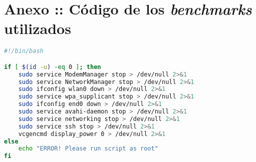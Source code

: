 \chapter{Anexo :: Código de los \textit{benchmarks} utilizados}
\label{cap:AnexoCodigo}

\begin{lstlisting}[language=bash,frame=single,caption={Código fuente para la desactivación de los servicios},showstringspaces=false,label=lst:desactivarServicios]
#!/bin/bash

if [ $(id -u) -eq 0 ]; then
    sudo service ModemManager stop > /dev/null 2>&1
    sudo service NetworkManager stop > /dev/null 2>&1
    sudo ifconfig wlan0 down > /dev/null 2>&1
    sudo service wpa_supplicant stop > /dev/null 2>&1
    sudo ifconfig end0 down > /dev/null 2>&1
    sudo service avahi-daemon stop > /dev/null 2>&1
    sudo service networking stop > /dev/null 2>&1
    sudo service ssh stop > /dev/null 2>&1
    vcgencmd display_power 0 > /dev/null 2>&1
else
    echo "ERROR! Please run script as root"
fi
\end{lstlisting}

